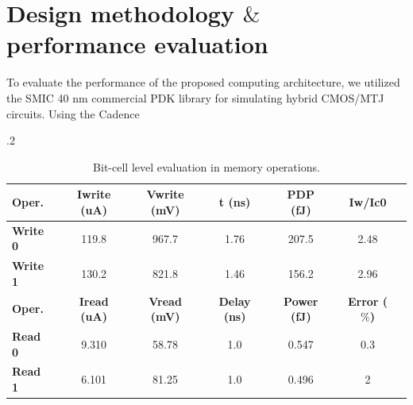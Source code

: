 \documentclass[submit]{elex2024}%
\begin{document}
\section{Design methodology $\&$ performance evaluation}
To evaluate the performance of the proposed computing architecture, we utilized the SMIC 40 nm commercial PDK library for simulating hybrid CMOS/MTJ circuits. Using the Cadence 
\begin{table}[ht]
    \small
    \caption{Bit-cell level evaluation in memory operations.} 
    \label{tab:3}
    \centering
    \tabcolsep.2\tabcolsep
    \begin{tabular}{lccccccccccc}
    \hline
    \textbf{Oper.}     & \quad & \textbf{Iwrite (uA)}     & \quad & \textbf{Vwrite (mV)}         & \quad & \textbf{t (ns)}       & \quad & \textbf{PDP (fJ)}        & \quad & \textbf{Iw/Ic0}             \\
    \hline
    \textbf{Write 0}      	& \quad & 119.8                    & \quad & 967.7                        & \quad & 1.76                  & \quad & 207.5                    & \quad & 2.48              \\
    \hline
    \textbf{Write 1}    	& \quad & 130.2                    & \quad & 821.8                        & \quad & 1.46                  & \quad & 156.2                    & \quad & 2.96     \\
    \hline
    \textbf{Oper.}     & \quad & \textbf{Iread (uA)}      & \quad & \textbf{Vread (mV)}  & \quad & \textbf{Delay (ns)}  & \quad & \textbf{Power (fJ)}   & \quad & \textbf{Error ($\%$)}     \\
    \hline
    \textbf{Read 0}         & \quad & 9.310                    & \quad & 58.78                & \quad & 1.0                  & \quad & 0.547                 & \quad & 0.3                            \\
    \hline
    \textbf{Read 1}         & \quad & 6.101                    & \quad & 81.25                & \quad & 1.0                   & \quad & 0.496                 & \quad & 2                              \\
    \hline
    \end{tabular}
\end{table}
\end{document}
